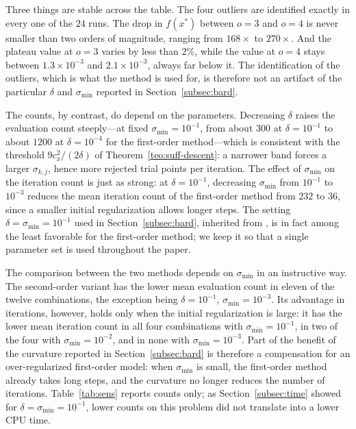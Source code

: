 \documentclass[11pt]{article}
\begin{document}
Three things are stable across the table. The four outliers are identified
exactly in every one of the $24$ runs. The drop in $f(x^*)$ between $o=3$ and
$o=4$ is never smaller than two orders of magnitude, ranging from $168\times$ to
$270\times$. And the plateau value at $o = 3$ varies by less than $2\%$, while
the value at $o = 4$ stays between $1.3 \times 10^{-3}$ and
$2.1 \times 10^{-3}$, always far below it. The identification of the outliers, which
is what the method is used for, is therefore not an artifact of the particular
$\delta$ and $\sigma_{\min}$ reported in Section~\ref{subsec:bard}.

The counts, by contrast, do depend on the parameters. Decreasing $\delta$
raises the evaluation count steeply---at fixed $\sigma_{\min}=10^{-1}$, from
about $300$ at $\delta=10^{-1}$ to about $1200$ at $\delta=10^{-4}$ for the
first-order method---which is consistent with the threshold $9c_x^2/(2\delta)$
of Theorem~\ref{teo:suff-descent}: a narrower band forces a larger
$\sigma_{k,j}$, hence more rejected trial points per iteration. The effect of
$\sigma_{\min}$ on the iteration count is just as strong: at
$\delta = 10^{-1}$, decreasing $\sigma_{\min}$ from $10^{-1}$ to $10^{-3}$
reduces the mean iteration count of the first-order method from $232$ to $36$,
since a smaller initial regularization allows longer steps. The setting
$\delta=\sigma_{\min}=10^{-1}$ used in Section~\ref{subsec:bard}, inherited
from \cite{alvarezovo}, is in fact among the least favorable for the
first-order method; we keep it so that a single parameter set is used
throughout the paper.

The comparison between the two methods depends on $\sigma_{\min}$ in an
instructive way. The second-order variant has the lower mean evaluation count in
eleven of the twelve combinations, the exception being
$\delta=10^{-1}$, $\sigma_{\min}=10^{-3}$. Its advantage in iterations,
however, holds only when the initial regularization is large: it has the lower
mean iteration count in all four combinations with $\sigma_{\min}=10^{-1}$, in
two of the four with $\sigma_{\min}=10^{-2}$, and in none with
$\sigma_{\min}=10^{-3}$. Part of the benefit of the curvature reported in
Section~\ref{subsec:bard} is therefore a compensation for an over-regularized
first-order model: when $\sigma_{\min}$ is small, the first-order method already
takes long steps, and the curvature no longer reduces the number of iterations.
Table~\ref{tab:sens} reports counts only; as Section~\ref{subsec:time} showed
for $\delta = \sigma_{\min} = 10^{-1}$, lower counts on this problem did not
translate into a lower CPU time.
\end{document}
